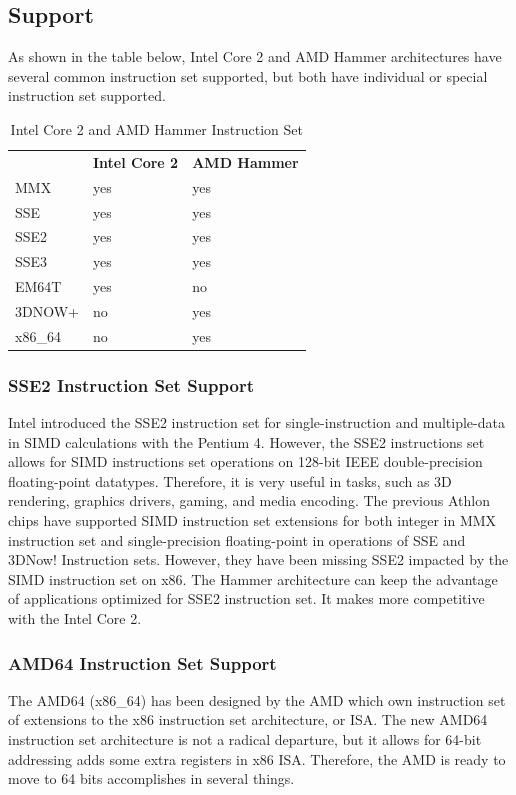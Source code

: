 \documentclass[letterpaper,10pt,compsoc,draftclsnofoot,onecolumn]{IEEEtran}
\begin{document}
\subsection{Support}
As shown in the table below, Intel Core 2 and AMD Hammer architectures have several common instruction set supported, but both have individual or special instruction set supported.

\begin{table}[!bhpt]
\captionsetup{justification=centering, aboveskip=2em, belowskip=0em}
\begin{tabularx}{\textwidth}{m{}m{}m{}}
 & \textbf{Intel Core 2} & \textbf{AMD Hammer}
\\
MMX & yes & yes
\\
SSE & yes & yes
\\
SSE2 & yes & yes
\\
SSE3 & yes & yes
\\
EM64T & yes & no
\\
3DNOW+ & no & yes
\\
x86\_64 & no & yes
\end{tabularx}
\caption{Intel Core 2 and AMD Hammer Instruction Set}
\end{table}

\subsubsection{SSE2 Instruction Set Support}
Intel introduced the SSE2 instruction set for single-instruction and multiple-data in SIMD calculations with the Pentium 4. However, the SSE2 instructions set allows for SIMD instructions set operations on 128-bit IEEE double-precision floating-point datatypes\cite{amd_athlon_64}. Therefore, it is very useful in tasks, such as 3D rendering, graphics drivers, gaming, and media encoding. The previous Athlon chips have supported SIMD instruction set extensions for both integer in MMX instruction set and single-precision floating-point in operations of SSE and 3DNow! Instruction sets. However, they have been missing SSE2 impacted by the SIMD instruction set on x86. The Hammer architecture can keep the advantage of applications optimized for SSE2 instruction set. It makes more competitive with the Intel Core 2.

\subsubsection{AMD64 Instruction Set Support}
The AMD64 (x86\_64) has been designed by the AMD which own instruction set of extensions to the x86 instruction set architecture, or ISA. The new AMD64 instruction set architecture is not a radical departure, but it allows for 64-bit addressing adds some extra registers in x86 ISA. Therefore, the AMD is ready to move to 64 bits accomplishes in several things.
\end{document}
